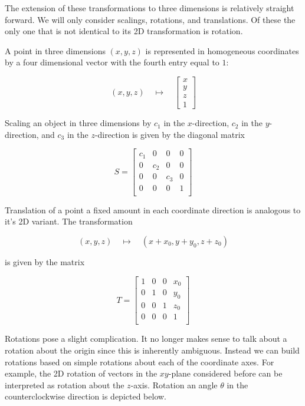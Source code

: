 \documentclass[12pt]{article}
\newcommand{\nin}{\noindent}
\newcommand{\vthree}{\vspace{3mm}}
\newcommand{\myp}[1]{\left( #1 \right)}
\newcommand{\mymat}[1]{
\left[
\begin{array}{rrrrrrrrrrrrrrrrrrrrrrrrrrrrrrrrrrrrrrr}
#1
\end{array}
\right]
}
\begin{document}
\vthree

\nin The extension of these transformations to three dimensions is relatively straight forward.  We will only consider scalings, rotations, and translations.  Of these the only one that is not identical to its 2D transformation is rotation.

\vthree

\nin A point in three dimensions $\myp{x,y,z}$ is represented in homogeneous coordinates by a four dimensional vector with the fourth entry equal to $1$:


\[
\myp{x,y,z} \quad \mapsto \quad \mymat{x \\ y \\ z \\ 1}
\]

\clearpage

\nin Scaling an object in three dimensions by $c_1$ in the $x$-direction, $c_2$ in the $y$-direction, and $c_3$ in the $z$-direction is given by the diagonal matrix

\[
S =
\mymat{
c_1 & 0 & 0     & 0 \\
0   & c_2 & 0   & 0 \\
0   & 0   & c_3 & 0 \\
0   & 0   & 0   & 1 \\
}
\]

\vthree

\nin Translation of a point a fixed amount in each coordinate direction is analogous to it's 2D variant.  The transformation

\[
\myp{x,y,z} \quad \mapsto \quad \myp{x+x_0, y+y_0, z+z_0}
\]

\nin is given by the matrix

\[
T =
\mymat{
1 & 0 & 0 & x_0 \\
0 & 1 & 0 & y_0 \\
0 & 0 & 1 & z_0 \\
0 & 0 & 0 & 1 \\
}
\]

\vthree

\nin Rotations pose a slight complication.  It no longer makes sense to talk about a rotation about the origin since this is inherently ambiguous.  Instead we can build rotations based on simple rotations about each of the coordinate axes.  For example, the 2D rotation of vectors in the $xy$-plane considered before can be interpreted as rotation about the $z$-axis.  Rotation an angle $\theta$ in the counterclockwise direction is depicted below.


\vspace{10mm}
\end{document}
